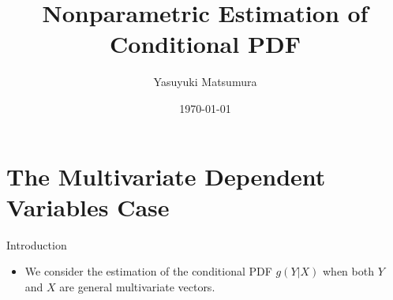 \documentclass[xcolor=svgnames,dvipdfmx,cjk]{beamer}
\theoremstyle{example}
\begin{document}
 

\title[Li and Racine (2007) Section 5.4]{Nonparametric Estimation of Conditional PDF} 
\author[Y. Matsumura]{Yasuyuki Matsumura}          
\date{\today}


\begin{frame}                  
\titlepage                     
\end{frame}


\begin{frame}                  
\tableofcontents
\end{frame}




\section{The Multivariate Dependent Variables Case}

\begin{frame}{Introduction}
  \begin{itemize}
    \item We consider the estimation of the conditional PDF $g(Y|X)$
          when both $Y$ and $X$ are general multivariate vectors.
  \end{itemize}
\end{frame}
\end{document}
